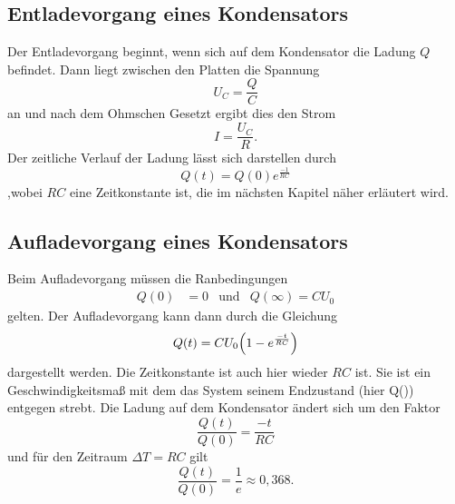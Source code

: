 \subsection{Entladevorgang eines Kondensators} %
\label{sub:Entladevorgang}
Der Entladevorgang beginnt, wenn sich auf dem Kondensator die Ladung $Q$ befindet.
Dann liegt zwischen den Platten die Spannung
\begin{equation}
    U_C = \frac{Q}{C}
    \label{eqn:Kondensatorspannung}
\end{equation}
an und nach dem Ohmschen Gesetzt ergibt dies den Strom
\begin{equation}
    I = \frac{U_C}{R} .
\end{equation}
Der zeitliche Verlauf der Ladung lässt sich darstellen durch
\begin{equation}
    Q(t) = Q(0) e^{\frac{-1}{RC}}
    \label{eqn:Ladung_zeitlich}
\end{equation}
,wobei $RC$ eine Zeitkonstante ist, die im nächsten Kapitel näher erläutert wird.


\subsection{Aufladevorgang eines Kondensators} %
\label{sub:Aufladevorgang}
Beim Aufladevorgang müssen die Ranbedingungen
\begin{align}
    Q(0)&=0 &\text{und}& Q(\infty)=CU_0
\end{align}
gelten. Der Aufladevorgang kann dann durch die Gleichung
\begin{equation}
    Q(t)= CU_0\Bigl(1-e^{\frac{-t}{RC}}\Bigr)
\end{equation}
dargestellt werden. Die Zeitkonstante ist auch hier wieder $RC$ ist.
Sie ist ein Geschwindigkeitsmaß mit dem das System seinem Endzustand (hier Q(\infty)) entgegen strebt.
Die Ladung auf dem Kondensator ändert sich um den Faktor
\begin{equation}
    \frac{Q(t)}{Q(0)} = \frac{-t}{RC}
\end{equation}
und für den Zeitraum $\Delta T = RC$ gilt
\begin{equation}
    \frac{Q(t)}{Q(0)} = \frac{1}{e} \approx 0,368 .
\end{equation}



